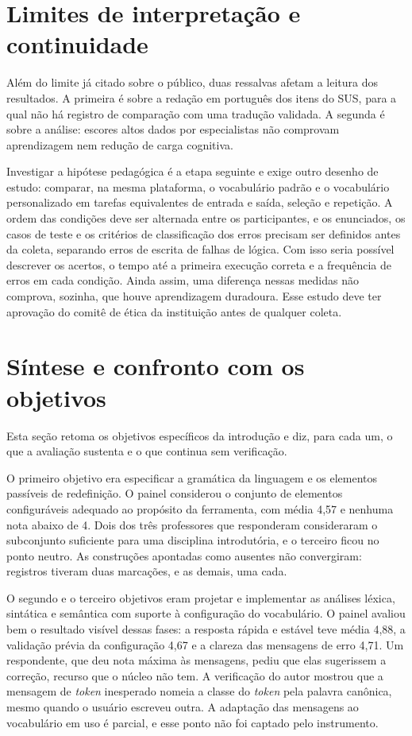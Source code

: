 \section{Limites de interpretação e continuidade}
\label{subsec:limites-interpretacao}

Além do limite já citado sobre o público, duas ressalvas afetam a leitura dos resultados. A primeira é sobre a redação em português dos itens do SUS, para a qual não há registro de comparação com uma tradução validada. A segunda é sobre a análise: escores altos dados por especialistas não comprovam aprendizagem nem redução de carga cognitiva.

Investigar a hipótese pedagógica é a etapa seguinte e exige outro desenho de estudo: comparar, na mesma plataforma, o vocabulário padrão e o vocabulário personalizado em tarefas equivalentes de entrada e saída, seleção e repetição. A ordem das condições deve ser alternada entre os participantes, e os enunciados, os casos de teste e os critérios de classificação dos erros precisam ser definidos antes da coleta, separando erros de escrita de falhas de lógica. Com isso seria possível descrever os acertos, o tempo até a primeira execução correta e a frequência de erros em cada condição. Ainda assim, uma diferença nessas medidas não comprova, sozinha, que houve aprendizagem duradoura. Esse estudo deve ter aprovação do comitê de ética da instituição antes de qualquer coleta.
\section{Síntese e confronto com os objetivos}
\label{sec:resultado-sintese}

Esta seção retoma os objetivos específicos da introdução e diz, para cada um, o que a avaliação sustenta e o que continua sem verificação.

O primeiro objetivo era especificar a gramática da linguagem e os elementos passíveis de redefinição. O painel considerou o conjunto de elementos configuráveis adequado ao propósito da ferramenta, com média 4,57 e nenhuma nota abaixo de 4. Dois dos três professores que responderam consideraram o subconjunto suficiente para uma disciplina introdutória, e o terceiro ficou no ponto neutro. As construções apontadas como ausentes não convergiram: registros tiveram duas marcações, e as demais, uma cada.

O segundo e o terceiro objetivos eram projetar e implementar as análises léxica, sintática e semântica com suporte à configuração do vocabulário. O painel avaliou bem o resultado visível dessas fases: a resposta rápida e estável teve média 4,88, a validação prévia da configuração 4,67 e a clareza das mensagens de erro 4,71. Um respondente, que deu nota máxima às mensagens, pediu que elas sugerissem a correção, recurso que o núcleo não tem. A verificação do autor mostrou que a mensagem de \textit{token} inesperado nomeia a classe do \textit{token} pela palavra canônica, mesmo quando o usuário escreveu outra. A adaptação das mensagens ao vocabulário em uso é parcial, e esse ponto não foi captado pelo instrumento.

